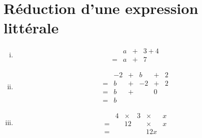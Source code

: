 \documentclass[../main.tex]{subfiles}
\begin{document}
        \part{Réduction d'une expression littérale}
        \begin{exemple}
            \begin{enumerate}[i),font=\bfseries]
                \item$$\begin{array}{cccc}
                    &a&+&3+4\\
                    =&a&+&7
                \end{array}$$
                \item$$\begin{array}{cccccc}
                    &-2&+&b&+&2\\
                    =&b&+&-2&+&2\\
                    =&b&+&&0&\\
                    =&b&&&&
                \end{array}$$
                \item$$\begin{array}{cccccc}
                    &4&\times&3&\times&x\\
                    =&&12&&\times&x\\
                    =&&&&12x&
                \end{array}$$
            \end{enumerate}
        \end{exemple}
\end{document}
